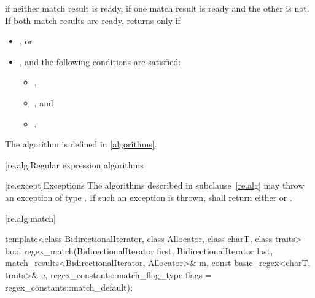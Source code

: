 \begin{itemdescr}
\pnum
\returns
{} if neither match result is ready,  if one match result is ready and the
other is not. If both match results are ready, returns  only if
\begin{itemize}
\item
{}, or

\item
{}, and the following conditions are satisfied:
\begin{itemize}
\item
{},

\item
{}, and

\item
{}.
\end{itemize}
\end{itemize}
\begin{note}
The algorithm  is defined in \ref{algorithms}.
\end{note}
\end{itemdescr}

[re.alg]{Regular expression algorithms}

[re.except]{Exceptions}
\pnum
The algorithms described in subclause~\ref{re.alg} may throw an exception
of type . If such an exception  is thrown,
 shall return either 
or .

[re.alg.match]{}
%
\begin{itemdecl}
template<class BidirectionalIterator, class Allocator, class charT, class traits>
  bool regex_match(BidirectionalIterator first, BidirectionalIterator last,
                   match_results<BidirectionalIterator, Allocator>& m,
                   const basic_regex<charT, traits>& e,
                   regex_constants::match_flag_type flags = regex_constants::match_default);
\end{itemdecl}

